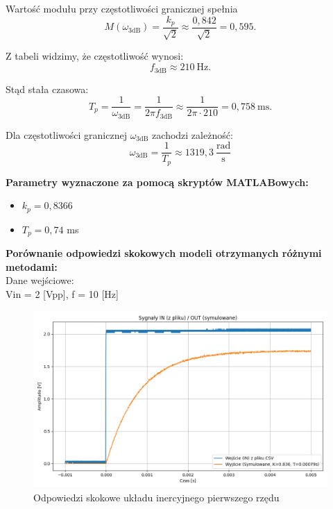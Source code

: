 \documentclass[12pt,a4paper]{article}
\begin{document}
	Wartość modułu przy częstotliwości granicznej spełnia
	\begin{equation}
		M(\omega_{3\text{dB}})=\frac{k_p}{\sqrt{2}} \approx \frac{0{,}842}{\sqrt{2}} = 0{,}595.
	\end{equation}
	
	Z tabeli widzimy, że częstotliwość wynosi:
	\[
	f_{3\text{dB}} \approx 210\ \text{Hz}.
	\]
	
	Stąd stała czasowa:
	\begin{equation}
		T_p = \frac{1}{\omega_{3\text{dB}}} = \frac{1}{2\pi f_{3\text{dB}}}
		\approx \frac{1}{2\pi\cdot 210} = 0{,}758\ \text{ms}.
	\end{equation}
	
	Dla częstotliwości granicznej $\omega_{3\text{dB}}$ zachodzi zależność:
	\begin{equation}
		\omega_{3\text{dB}} = \frac{1}{T_p} \approx 1319{,}3~\frac{\text{rad}}{\text{s}}
	\end{equation}
	
	\textbf{Parametry wyznaczone za pomocą skryptów MATLABowych:}
	\begin{itemize}
		\item $k_p = 0{,}8366$
		\item $T_p = 0{,}74$ ms
	\end{itemize}
	
	\textbf{Porównanie odpowiedzi skokowych modeli otrzymanych różnymi metodami:} \\
	Dane wejściowe: \\
	Vin = 2 [Vpp], f = 10 [Hz]
	
	\begin{figure}[H]
		\centering
		\includegraphics[width=1\linewidth]{zdjecia/OdpSkokowa1.png}
		\caption{Odpowiedzi skokowe układu inercyjnego pierwszego rzędu}
		\label{fig:OdpSkokowa1}
	\end{figure}
	
\end{document}
